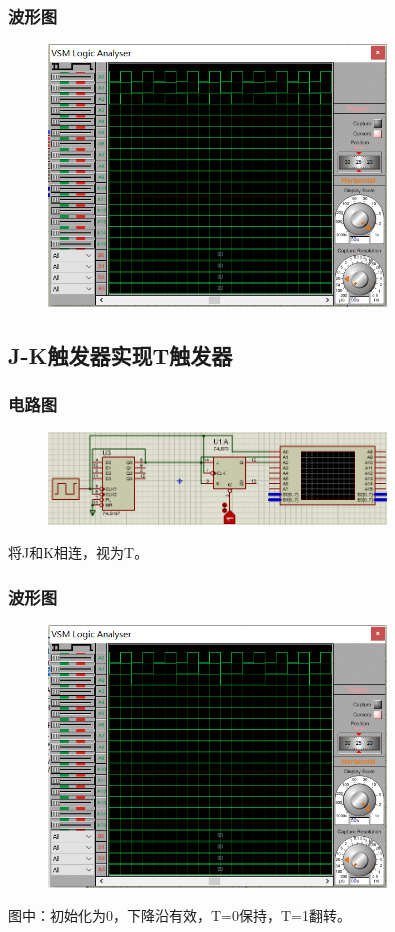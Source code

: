 \documentclass[UTF8, a4paper, 11pt]{article}
\begin{document}
\subsubsection{波形图}
\begin{figure}[H]
    \centering
    \includegraphics[width=0.8\textwidth]{ex9.3波形图.png}
\end{figure}
\subsection{J-K触发器实现T触发器}
\subsubsection{电路图}
\begin{figure}[H]
    \centering
    \includegraphics[width=0.8\textwidth]{ex9.4电路图.png}
\end{figure}
将J和K相连，视为T。
\subsubsection{波形图}
\begin{figure}[H]
    \centering
    \includegraphics[width=0.8\textwidth]{ex9.4波形图.png}
\end{figure}
图中：初始化为0，下降沿有效，T=0保持，T=1翻转。
\end{document}
